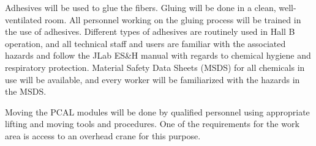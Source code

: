 Adhesives will be used to glue the fibers.  Gluing will be done in a clean,
well-ventilated room.  All personnel working on the gluing process will be 
trained in the use of adhesives.  Different types of adhesives are routinely 
used in Hall B operation, and all technical staff and users are familiar
with the associated hazards and follow the JLab ES\&H manual with regards
to chemical hygiene and respiratory protection.  Material Safety Data Sheets 
(MSDS) for all chemicals in use will be available, and every worker will be 
familiarized with the hazards in the MSDS.

Moving the PCAL modules will be done by qualified personnel using
appropriate lifting and moving tools and procedures.  One of the
requirements for the work area is access to an overhead crane for this
purpose. 

